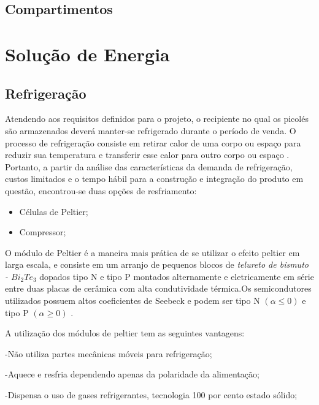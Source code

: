 \subsection{Compartimentos}


\section{Solução de Energia}

\subsection{Refrigeração}
Atendendo aos requisitos definidos para o projeto, o recipiente no qual os picolés são armazenados deverá manter-se refrigerado durante o período de venda. O processo de refrigeração consiste em retirar calor de uma corpo ou espaço para reduzir sua temperatura e transferir esse calor para outro corpo ou espaço \cite{campos2010refrigeraccao}. Portanto, a partir da análise das características da demanda de refrigeração, custos limitados e o tempo hábil para a construção e integração do produto em questão, encontrou-se duas opções de resfriamento:

\begin{itemize}
\item Células de Peltier;
\end{itemize}

\begin{itemize}
\item Compressor;
\end{itemize}


O módulo de Peltier é a maneira mais prática de se utilizar o efeito peltier em larga escala, e consiste em um arranjo de pequenos blocos de \textit{telureto de bismuto - $Bi_{2}Te_{3}$} dopados tipo N e tipo P montados alternamente e eletricamente em série entre duas placas de cerâmica com alta condutividade térmica.Os semicondutores utilizados possuem altos coeficientes de Seebeck e podem ser tipo N $(\alpha \leq 0)$ e tipo P $(\alpha \geq 0)$  \cite{campos2010refrigeraccao}.

A utilização dos módulos de peltier tem as seguintes vantagens:

-Não utiliza partes mecânicas móveis para refrigeração;

-Aquece e resfria dependendo apenas da polaridade da alimentação;

-Dispensa o uso de gases refrigerantes, tecnologia 100 por cento estado sólido;

